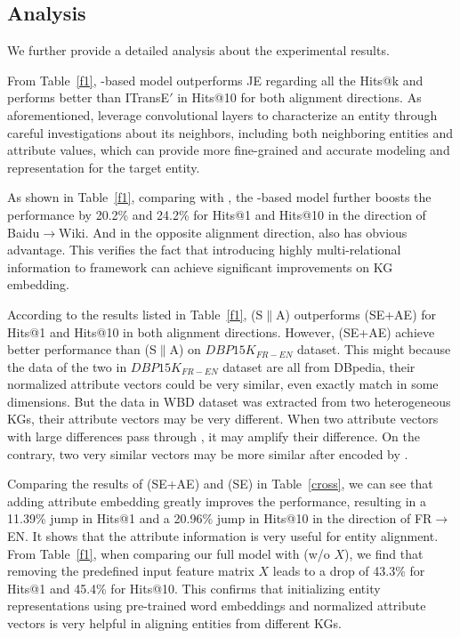 \subsection{Analysis}



We further provide a detailed analysis about the experimental results.

From Table~\ref{f1}, \GCN-based model outperforms JE regarding all the Hits@k and performs better than ITransE$'$ in Hits@10 for both alignment directions. As aforementioned, \GCNs leverage convolutional layers to characterize an entity through careful investigations about its neighbors, including both neighboring entities and attribute values, which can provide more fine-grained and accurate modeling and representation for the target entity.

 As shown in Table~\ref{f1}, comparing with \GCN, the \RGCN-based model further boosts the performance by 20.2\% and 24.2\% for Hits@1 and Hits@10 in the direction of Baidu$\rightarrow$Wiki. And in the opposite alignment direction, \RGCN also has obvious advantage. This verifies the fact that introducing highly multi-relational information to \GCN framework can achieve significant improvements on KG embedding.

According to the results listed in Table~\ref{f1}, \HRGCN (S$\|$A) outperforms \HRGCN (SE+AE) for Hits@1 and Hits@10 in both alignment directions. However, \HRGCN (SE+AE) achieve better performance than \HRGCN (S$\|$A) on $DBP15K_{FR-EN}$ dataset. This might because the data of the two \KGs in $DBP15K_{FR-EN}$ dataset are all from DBpedia, their normalized attribute vectors could be very similar, even exactly match in some dimensions. But the data in WBD dataset was extracted from two heterogeneous KGs, their attribute vectors may be very different. When two attribute vectors with large differences pass through \HRGCNs, it may amplify their difference. On the contrary, two very similar vectors may be more similar after encoded by \HRGCNs.


Comparing the results of \HRGCN (SE+AE) and \HRGCN (SE) in Table~\ref{cross}, we can see that adding attribute embedding greatly improves the performance, resulting in a 11.39\% jump in Hits@1 and a 20.96\% jump in Hits@10 in the direction of FR$\rightarrow$EN. It shows that the attribute information is very useful for entity alignment. 
From Table~\ref{f1}, when comparing our full model \HRGCN with \HRGCN (w/o $X$), we find that removing the predefined input feature matrix $X$ leads to a drop of 43.3\% for Hits@1 and 45.4\% for Hits@10. This confirms that initializing entity representations using pre-trained word embeddings and normalized attribute vectors is very helpful in aligning entities from different KGs.

